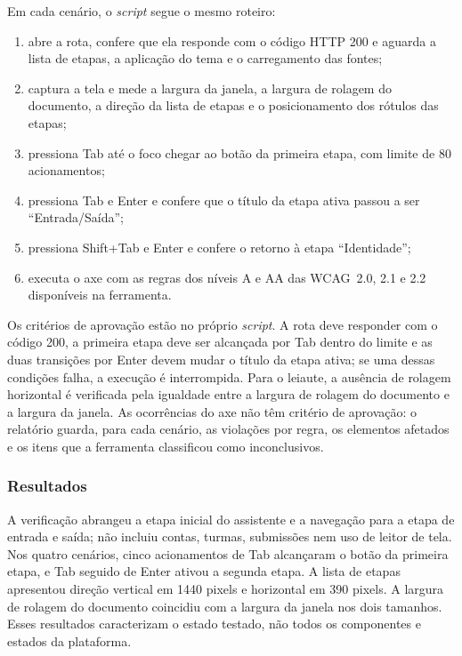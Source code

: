Em cada cenário, o \textit{script} segue o mesmo roteiro:

\begin{enumerate}
    \item abre a rota, confere que ela responde com o código HTTP 200 e aguarda a lista de etapas, a aplicação do tema e o carregamento das fontes;
    \item captura a tela e mede a largura da janela, a largura de rolagem do documento, a direção da lista de etapas e o posicionamento dos rótulos das etapas;
    \item pressiona Tab até o foco chegar ao botão da primeira etapa, com limite de 80 acionamentos;
    \item pressiona Tab e Enter e confere que o título da etapa ativa passou a ser ``Entrada/Saída'';
    \item pressiona Shift+Tab e Enter e confere o retorno à etapa ``Identidade'';
    \item executa o axe com as regras dos níveis A e AA das WCAG~2.0, 2.1 e 2.2 disponíveis na ferramenta.
\end{enumerate}

Os critérios de aprovação estão no próprio \textit{script}. A rota deve responder com o código 200, a primeira etapa deve ser alcançada por Tab dentro do limite e as duas transições por Enter devem mudar o título da etapa ativa; se uma dessas condições falha, a execução é interrompida. Para o leiaute, a ausência de rolagem horizontal é verificada pela igualdade entre a largura de rolagem do documento e a largura da janela. As ocorrências do axe não têm critério de aprovação: o relatório guarda, para cada cenário, as violações por regra, os elementos afetados e os itens que a ferramenta classificou como inconclusivos.

\subsubsection{Resultados}

A verificação abrangeu a etapa inicial do assistente e a navegação para a etapa de entrada e saída; não incluiu contas, turmas, submissões nem uso de leitor de tela. Nos quatro cenários, cinco acionamentos de Tab alcançaram o botão da primeira etapa, e Tab seguido de Enter ativou a segunda etapa. A lista de etapas apresentou direção vertical em 1440 pixels e horizontal em 390 pixels. A largura de rolagem do documento coincidiu com a largura da janela nos dois tamanhos. Esses resultados caracterizam o estado testado, não todos os componentes e estados da plataforma.

